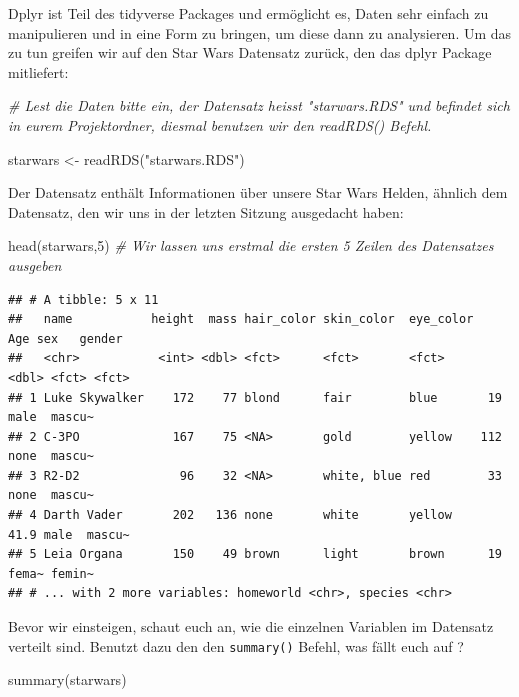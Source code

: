 \documentclass[
]{book}
\newenvironment{Shaded}{\begin{snugshade}}{\end{snugshade}}
\newcommand{\CommentTok}[1]{\textcolor[rgb]{0.56,0.35,0.01}{\textit{#1}}}
\newcommand{\DecValTok}[1]{\textcolor[rgb]{0.00,0.00,0.81}{#1}}
\newcommand{\FunctionTok}[1]{\textcolor[rgb]{0.00,0.00,0.00}{#1}}
\newcommand{\NormalTok}[1]{#1}
\newcommand{\OtherTok}[1]{\textcolor[rgb]{0.56,0.35,0.01}{#1}}
\newcommand{\StringTok}[1]{\textcolor[rgb]{0.31,0.60,0.02}{#1}}
\theoremstyle{definition}
\theoremstyle{definition}
\theoremstyle{definition}
\theoremstyle{definition}
\theoremstyle{remark}
\begin{document}
Dplyr ist Teil des tidyverse Packages und ermöglicht es, Daten sehr einfach zu manipulieren und in eine Form zu bringen, um diese dann zu analysieren. Um das zu tun greifen wir auf den Star Wars Datensatz zurück, den das dplyr Package mitliefert:

\begin{Shaded}
\begin{Highlighting}[]
\CommentTok{\# Lest die Daten bitte ein, der Datensatz heisst "starwars.RDS" und befindet sich in eurem Projektordner, diesmal benutzen wir den readRDS() Befehl.}

\NormalTok{starwars }\OtherTok{\textless{}{-}} \FunctionTok{readRDS}\NormalTok{(}\StringTok{"starwars.RDS"}\NormalTok{)}
\end{Highlighting}
\end{Shaded}

Der Datensatz enthält Informationen über unsere Star Wars Helden, ähnlich dem Datensatz, den wir uns in der letzten Sitzung ausgedacht haben:

\begin{Shaded}
\begin{Highlighting}[]
\FunctionTok{head}\NormalTok{(starwars,}\DecValTok{5}\NormalTok{) }\CommentTok{\# Wir lassen uns erstmal die ersten 5 Zeilen des Datensatzes ausgeben}
\end{Highlighting}
\end{Shaded}

\begin{verbatim}
## # A tibble: 5 x 11
##   name           height  mass hair_color skin_color  eye_color   Age sex   gender
##   <chr>           <int> <dbl> <fct>      <fct>       <fct>     <dbl> <fct> <fct> 
## 1 Luke Skywalker    172    77 blond      fair        blue       19   male  mascu~
## 2 C-3PO             167    75 <NA>       gold        yellow    112   none  mascu~
## 3 R2-D2              96    32 <NA>       white, blue red        33   none  mascu~
## 4 Darth Vader       202   136 none       white       yellow     41.9 male  mascu~
## 5 Leia Organa       150    49 brown      light       brown      19   fema~ femin~
## # ... with 2 more variables: homeworld <chr>, species <chr>
\end{verbatim}

Bevor wir einsteigen, schaut euch an, wie die einzelnen Variablen im Datensatz verteilt sind. Benutzt dazu den den \texttt{summary()} Befehl, was fällt euch auf ?

\begin{Shaded}
\begin{Highlighting}[]
\FunctionTok{summary}\NormalTok{(starwars)}
\end{Highlighting}
\end{Shaded}
\end{document}
